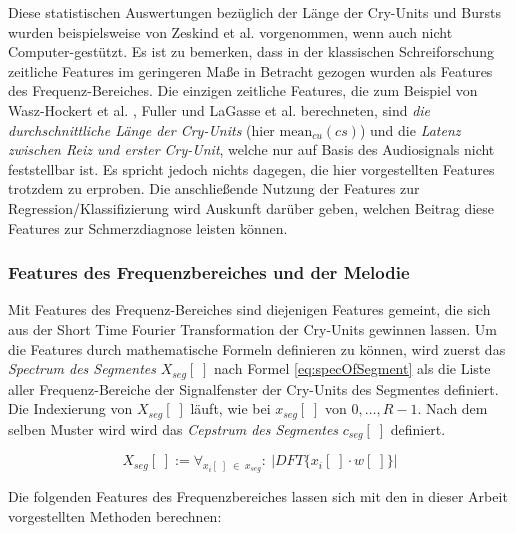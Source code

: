 Diese statistischen Auswertungen bezüglich der Länge der Cry-Units und Bursts wurden beispielsweise von Zeskind et al. \cite{rythmic} vorgenommen, wenn auch nicht Computer-gestützt. Es ist zu bemerken, dass in der klassischen Schreiforschung zeitliche Features im geringeren Maße in Betracht gezogen wurden als Features des Frequenz-Bereiches. Die einzigen zeitliche Features, die zum Beispiel von Wasz-Hockert et al. \cite{25years}, Fuller \cite{threeCryTypes} und LaGasse et al. \cite{parentalPerception} berechneten, sind \emph{die durchschnittliche Länge der Cry-Units} (hier $\text{mean}_{cu}(cs)$) und die \emph{Latenz zwischen Reiz und erster Cry-Unit}, welche nur auf Basis des Audiosignals nicht feststellbar ist. Es spricht jedoch nichts dagegen, die hier vorgestellten Features trotzdem zu erproben. Die anschließende Nutzung der Features zur Regression/Klassifizierung wird Auskunft darüber geben, welchen Beitrag diese Features zur Schmerzdiagnose leisten können.

\subsubsection*{Features des Frequenzbereiches und der Melodie}

Mit Features des Frequenz-Bereiches sind diejenigen Features gemeint, die sich aus der Short Time Fourier Transformation der Cry-Units gewinnen lassen. Um die Features durch mathematische Formeln definieren zu können, wird zuerst das \emph{Spectrum des Segmentes} $X_{seg}[\;]$ nach Formel \ref{eq:specOfSegment} als die Liste aller Frequenz-Bereiche der Signalfenster der Cry-Units des Segmentes definiert. Die Indexierung von $X_{seg}[\;]$ läuft, wie bei $x_{seg}[\;]$ von $0 , \ldots , R-1$. Nach dem selben Muster wird wird das \emph{Cepstrum des Segmentes} $c_{seg}[\;]$ definiert.

\begin{equation}
X_{seg}[\; ] := \mathop{\forall}_{x_i[\;] \; \in \; x_{seg}} :\ |DFT\{x_i[\;] \cdot w[\;]\}|
\label{eq:specOfSegment}
\end{equation}

Die folgenden Features des Frequenzbereiches lassen sich mit den in dieser Arbeit vorgestellten Methoden berechnen:


